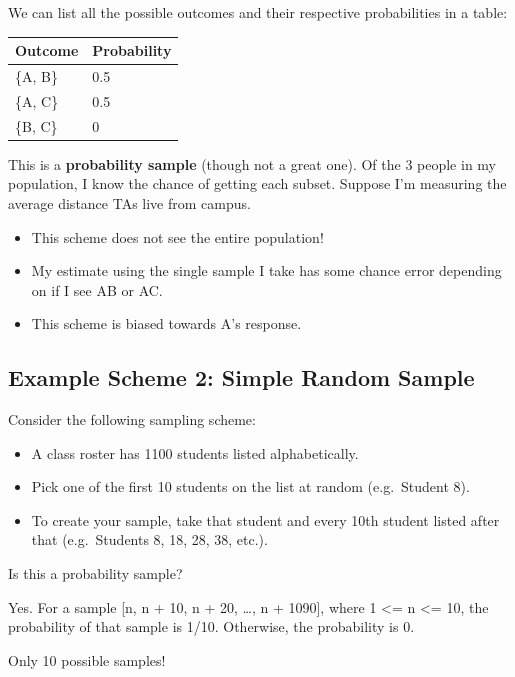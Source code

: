 \documentclass[
  letterpaper,
  DIV=11,
  numbers=noendperiod]{scrreprt}
\providecommand{\tightlist}{%
  \setlength{\itemsep}{0pt}\setlength{\parskip}{0pt}}\usepackage{longtable,booktabs,array}
\begin{document}
We can list all the possible outcomes and their respective probabilities
in a table:

\begin{longtable}[]{@{}ll@{}}
\toprule\noalign{}
Outcome & Probability \\
\midrule\noalign{}
\endhead
\bottomrule\noalign{}
\endlastfoot
\{A, B\} & 0.5 \\
\{A, C\} & 0.5 \\
\{B, C\} & 0 \\
\end{longtable}

This is a \textbf{probability sample} (though not a great one). Of the 3
people in my population, I know the chance of getting each subset.
Suppose I'm measuring the average distance TAs live from campus.

\begin{itemize}
\tightlist
\item
  This scheme does not see the entire population!
\item
  My estimate using the single sample I take has some chance error
  depending on if I see AB or AC.
\item
  This scheme is biased towards A's response.
\end{itemize}

\subsection{Example Scheme 2: Simple Random
Sample}\label{example-scheme-2-simple-random-sample}

Consider the following sampling scheme:

\begin{itemize}
\tightlist
\item
  A class roster has 1100 students listed alphabetically.
\item
  Pick one of the first 10 students on the list at random (e.g.~Student
  8).
\item
  To create your sample, take that student and every 10th student listed
  after that (e.g.~Students 8, 18, 28, 38, etc.).
\end{itemize}

Is this a probability sample?

Yes. For a sample {[}n, n + 10, n + 20, \ldots, n + 1090{]}, where 1
\textless= n \textless= 10, the probability of that sample is 1/10.
Otherwise, the probability is 0.

Only 10 possible samples!
\end{document}
